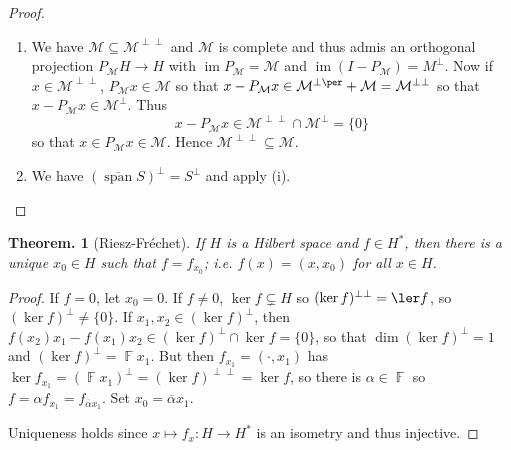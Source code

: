 \documentclass[11pt, a4paper]{memoir}
\DeclareMathOperator{\F}{{\mathbb{F}}}
\theoremstyle{change}
\newtheorem{theorem}{Theorem.}[section]
\theoremstyle{plain}
\theoremstyle{nonumberplain}
\newtheorem{proof}{Proof}
\DeclareMathOperator{\im}{im}
\DeclareMathOperator{\spn}{span}
\newcommand{\inr}[1]{\ensuremath{\left(#1\right)}}
\numberwithin{equation}{section}
\begin{document}
\begin{proof}
    \begin{enumerate}[nl,r]
        \item We have $\mathcal{M}\subseteq\mathcal{M}^{\perp\perp}$ and $\mathcal{M}$ is complete and thus admis an orthogonal projection $P_{\mathcal{M}}H\to H$ with $\im P_{\mathcal{M}}=\mathcal{M}$ and $\im(I-P_{\mathcal{M}})=M^\perp$.
            Now if $x\in\mathcal{M}^{\perp\perp}$, $P_{\mathcal{M}}x\in\mathcal{M}$ so that $x-P_{\mathcal{M}}x\in\mathcal{M}^{\perp\per}+\mathcal{M}=\mathcal{M}^{\perp\perp}$ so that $x-P_{\mathcal{M}}x\in\mathcal{M}^\perp$.
            Thus
            \begin{equation*}
                x-P_{\mathcal{M}}x\in\mathcal{M}^{\perp\perp}\cap\mathcal{M}^\perp=\{0\}
            \end{equation*}
            so that $x\in P_{\mathcal{M}}x\in\mathcal{M}$.
            Hence $\mathcal{M}^{\perp\perp}\subseteq\mathcal{M}$.
        \item We have $(\overline{\spn} S)^\perp=S^\perp$ and apply (i).
    \end{enumerate}
\end{proof}
\begin{theorem}[Riesz-Fréchet]
    If $H$ is a Hilbert space and $f\in H^*$, then there is a unique $x_0\in H$ such that $f=f_{x_0}$; i.e. $f(x)=(x,x_0)$ for all $x\in H$.
\end{theorem}
\begin{proof}
    If $f=0$, let $x_0=0$.
    If $f\neq 0$, $\ker f\subsetneq H$ so $(\ker f)^{\perp\perp}=\ler f$, so $(\ker f)^\perp\neq\{0\}$.
    If $x_1,x_2\in(\ker f)^\perp$, then $f(x_2)x_1-f(x_1)x_2\in(\ker f)^\perp\cap\ker f=\{0\}$, so that $\dim(\ker f)^\perp=1$ and $(\ker f)^\perp=\F x_1$.
    But then $f_{x_1}=\inr{\cdot,x_1}$ has $\ker f_{x_1}=(\F x_1)^\perp=(\ker f)^{\perp\perp}=\ker f$, so there is $\alpha\in\F$ so $f=\alpha f_{x_1}=f_{\overline{\alpha}x_1}$.
    Set $x_0=\overline{\alpha}x_1$.

    Uniqueness holds since $x\mapsto f_x:H\to H^*$ is an isometry and thus injective.
\end{proof}
\end{document}
